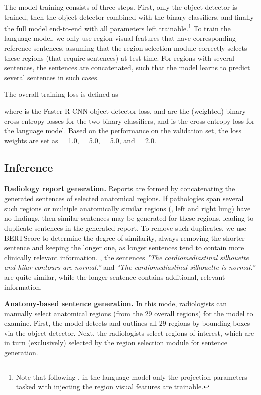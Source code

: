 \documentclass[10pt,twocolumn,letterpaper]{article}
\begin{document}
The model training consists of three steps. First, only the object detector is trained, then the object detector combined with the binary classifiers, and finally the full model end-to-end with all parameters left trainable.\footnote{Note that following \cite{ziegler2019encoder}, in the language model only the projection parameters tasked with injecting the region visual features are trainable.} To train the language model, we only use region visual features that have corresponding reference sentences, assuming that the region selection module correctly selects these regions (that require sentences) at test time. For regions with several sentences, the sentences are concatenated, such that the model learns to predict several sentences in such cases.

The overall training loss is defined as

where  is the Faster R-CNN object detector loss,  and  are the (weighted) binary cross-entropy losses for the two binary classifiers, and  is the cross-entropy loss for the language model. Based on the performance on the validation set, the loss weights are set as  = 1.0, = 5.0, = 5.0, and = 2.0.

\subsection{Inference}
\label{sec:inference}

\noindent\textbf{Radiology report generation.} Reports are formed by concatenating the generated sentences of selected anatomical regions. If pathologies span several such regions or multiple anatomically similar regions (\eg, left and right lung) have no findings, then similar sentences may be generated for these regions, leading to duplicate sentences in the generated report. To remove such duplicates, we use BERTScore \cite{zhang2019bertscore} to determine the degree of similarity, always removing the shorter sentence and keeping the longer one, as longer sentences tend to contain more clinically relevant information. \Eg, the sentences \emph{"The cardiomediastinal silhouette and hilar contours are normal.”} and \emph{"The cardiomediastinal silhouette is normal.”} are quite similar, while the longer sentence contains additional, relevant information.

\noindent\textbf{Anatomy-based sentence generation.} In this mode, radiologists can manually select anatomical regions (from the 29 overall regions) for the model to examine. First, the model detects and outlines all 29 regions by bounding boxes via the object detector. Next, the radiologists select regions of interest, which are in turn (exclusively) selected by the region selection module for sentence generation.
\end{document}
